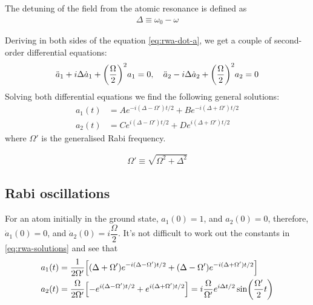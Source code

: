 \begin{defi}[Detuning]
	The detuning of the field from the atomic resonance is defined as
	\begin{align}
		\Delta \equiv \omega_{0} - \omega
	\end{align}
\end{defi}

Deriving in both sides of the equation \eqref{eq:rwa-dot-a}, we get a couple of second-order differential equations:
\begin{align*}
	\ddot{a}_{1} + i \Delta \dot{a}_{1} + \qty(\frac{\Omega}{2})^{2} a_{1} = 0 \qc
	\ddot{a}_{2} - i \Delta \dot{a}_{2} + \qty(\frac{\Omega}{2})^{2} a_{2} = 0
\end{align*}
Solving both differential equations we find the following general solutions:
\begin{subequations}
\begin{align}\label{eq:rwa-solutions}
	a_{1}(t) &= A e^{-i (\Delta - \Omega') t/2} + B e^{-i (\Delta + \Omega') t/2} \\
	a_{2}(t) &= C e^{i (\Delta - \Omega') t/2} + D e^{i (\Delta + \Omega') t/2}
\end{align}
\end{subequations}
where $\Omega'$ is the generalised Rabi frequency.

\begin{defi}
	\begin{align}
		\Omega' \equiv \sqrt{\Omega^{2} + \Delta^{2}}
	\end{align}
\end{defi}

\subsection{Rabi oscillations}
For an atom initially in the ground state, $a_{1}(0) = 1$, and $a_{2}(0) = 0$, therefore, $\dot{a}_{1}(0) = 0$, and $\dot{a}_{2}(0) = i \dfrac{\Omega}{2}$. It's not difficult to work out the constants in \eqref{eq:rwa-solutions} and see that
\begin{subequations}
\begin{align}
	a_{1}(t) &= \frac{1}{2 \Omega'} \qty[(\Delta + \Omega') e^{-i (\Delta - \Omega')t/2} + (\Delta - \Omega') e^{-i (\Delta + \Omega')t/2}] \\
	a_{2}(t) &= \frac{\Omega}{2 \Omega'} \qty[ - e^{i (\Delta - \Omega')t/2} + e^{i (\Delta + \Omega')t/2}] = i \frac{\Omega}{\Omega'} e^{i \Delta t/2} \sin(\frac{\Omega'}{2} t)
\end{align}
\end{subequations}

